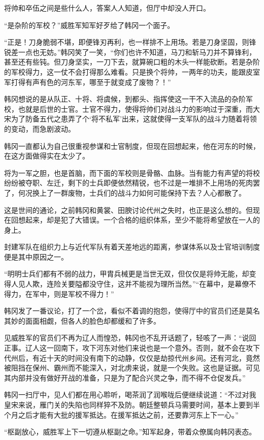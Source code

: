 将帅和卒伍之间是些什么人，答案人人知道，但厅中却没人开口。

“是杂阶的军校？”威胜军知军好歹给了韩冈一个面子。

“正是！刀身脆弱不堪，即便锋刃再利，也一样排不上用场。若是刀身坚固，则锋锐差一点也无妨。”韩冈笑了一笑，“你们也许不知道，马刀和斩马刀并不算锋利，甚至还有些钝。但刀身坚实，一刀下去，就算碗口粗的木头一样能砍断。若是杂阶的军校得力，这一仗不会打得那么难看。只是换个将帅，一两年的功夫，能跟皮室军打得有声有色的河东军，哪至于就变成了废物？！”

韩冈想说的是从队正、十将、将虞候，到都头、指挥使这一干不入流品的杂阶军校，也就是后世的士官。士官不得力，使得将帅们对战斗力的影响过于深重，而大宋为了防备五代之患弄了个‘将不私军’出来，这就使得一支军队的战斗力随着将领的变动，而急剧波动。

韩冈一直都认为自己很重视参谋和士官制度，但现在回想起来，他在河东的时候，在这方面做得实在太少了。

将为一军之胆，也是首脑，而下面的军校则是骨骼、血脉。当有能力有声望的将校纷纷被夺职、左迁，剩下的士兵即便依然精锐，也不过是一堆排不上用场的死肉罢了，何况换上了一群废物，士兵们的战斗力如何可能保持下去？人心都散了。

这是世间的通论，之前韩冈和黄裳、田腴讨论代州之失时，也正是这么想的。但现在回想起来，却是犯了大错误。一个合格的组织体系，至少不能将希望放在一人的身上。

封建军队在组织力上与近代军队有着天差地远的距离，参谋体系以及士官培训制度便是其中原因之一。

“明明士兵们都有不弱的战力，甲胄兵械更是当世无双，但仅仅是将帅无能，却变得人见人欺，连险关要隘都没守住，这并不能视为理所当然。”“在幕中，是幕僚不得力，在军中，则是军校不得力！”

韩冈发了一番议论，打了一个岔，看似不着调的抱怨，使得厅中的官员们还是莫名其妙的面面相觑，但各人的脸色却都缓和了许多。

见威胜军的官员们不再为辽人而惶恐，韩冈也不乱开话题了，轻咳了一声：“说回正事。辽人这一回南下，攻下河东对他们来说也是一个意外。否则，就不会在攻下代州后，有近十天的时间没有南下的动静，仅仅是劫掠代州乡间。还有河北，竟然被阻挡在保州、霸州而不能深入，对北虏来说，就是一个失败。这也是证据。可见其内部并没有做好开战的准备，只是为了配合兴灵之争，而不得不仓促发兵。”

韩冈一扫厅中，见人们都在用心聆听，喝茶润了润喉咙后便继续说道：“不过对我皇宋来说，雁门关的失陷也同样猝不及防。朝廷整顿兵马需要时间，基本上要到半个月之后才能有大批的援军抵达。在援军抵达之前，还要靠河东上下一心。”

“枢副放心，威胜军上下一切遵从枢副之命。”知军起身，带着众僚属向韩冈表态。

